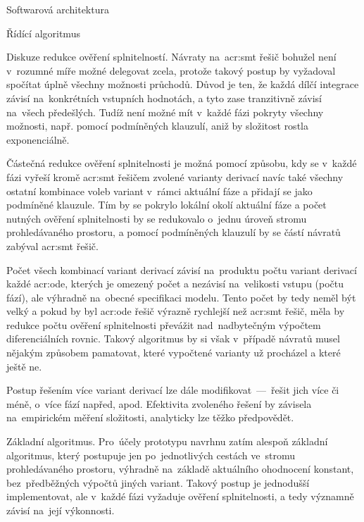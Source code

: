 \documentclass[thesis=M,czech]{FITthesis}[2012/06/26]
\newcommand{\acrlabel}[1]{acr:#1}
\newcommand{\acr}[1]{\acrshort{\acrlabel{#1}}}
\begin{document}
\begin{section}{Softwarová architektura}
\begin{subsection}{Řídící algoritmus}
\begin{paragraph}{Diskuze redukce ověření splnitelností.}
Návraty na~\acr{smt} řešič bohužel není v~rozumné míře
možné delegovat zcela,
protože takový postup by vyžadoval
spočítat úplně všechny možnosti průchodů.
Důvod je ten, že každá dílčí integrace závisí
na~konkrétních vstupních hodnotách,
a tyto zase tranzitivně závisí
na~všech předešlých.
Tudíž není možné mít v~každé fázi
pokryty všechny možnosti,
např. pomocí podmíněných klauzulí,
aniž by složitost rostla exponenciálně.

Částečná redukce ověření splnitelnosti
je možná pomocí způsobu,
kdy se v~každé fázi vyřeší
kromě \acr{smt} řešičem zvolené varianty derivací
navíc také všechny ostatní kombinace voleb variant
v~rámci aktuální fáze
a přidají se jako podmíněné klauzule.
Tím by se pokrylo lokální okolí aktuální fáze
a počet nutných ověření splnitelnosti
by se redukovalo o~jednu úroveň stromu prohledávaného prostoru,
a pomocí podmíněných klauzulí by se částí návratů zabýval \acr{smt} řešič.

Počet všech kombinací variant derivací
závisí na~produktu počtu variant derivací každé \acr{ode},
kterých je omezený počet a nezávisí na~velikosti vstupu (počtu fází),
ale výhradně na~obecné specifikaci modelu.
Tento počet by tedy neměl být velký
a pokud by byl \acr{ode} řešič výrazně rychlejší
než \acr{smt} řešič,
měla by redukce počtu ověření splnitelnosti
převážit nad~nadbytečným výpočtem diferenciálních rovnic.
Takový algoritmus by si však v~případě návratů
musel nějakým způsobem pamatovat,
které vypočtené varianty už procházel a které ještě ne.

Postup řešením více variant derivací
lze dále modifikovat~---~řešit jich více či méně,
o~více fází napřed, apod.
Efektivita zvoleného řešení by závisela
na~empirickém měření složitosti,
analyticky lze těžko předpovědět.
\end{paragraph} %


\begin{paragraph}{Základní algoritmus.}
\label{ss:design:arch:alg:discuss}
Pro~účely prototypu navrhnu zatím alespoň základní algoritmus,
který postupuje jen po~jednotlivých
cestách ve~stromu prohledávaného prostoru,
výhradně na~základě aktuálního ohodnocení konstant,
bez~předběžných výpočtů jiných variant.
Takový postup je jednodušší implementovat,
ale v~každé fázi vyžaduje ověření splnitelnosti,
a tedy významně závisí na~její výkonnosti.


\end{paragraph}
\end{subsection}
\end{section}
\end{document}
